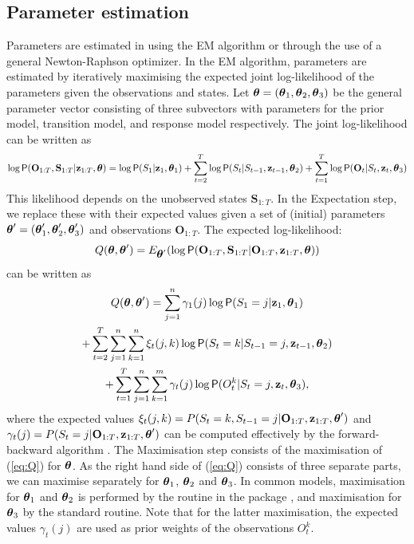 \documentclass[article]{jss}
\newcommand{\vc}{\mathbf}
\newcommand{\greekv}[1]{\mbox{\boldmath$\mathrm{#1}$}}
\begin{document}
\subsection{Parameter estimation}

Parameters are estimated in  using the EM algorithm or
through the use of a general Newton-Raphson optimizer.  In the EM
algorithm, parameters are estimated by iteratively maximising the
expected joint log-likelihood of the parameters given the observations and
states.  Let $\greekv{\theta} = (\greekv{\theta}_1,
\greekv{\theta}_2,\greekv{\theta}_3)$ be the general parameter vector
consisting of three subvectors with parameters for the prior model,
transition model, and response model respectively.  The joint
log-likelihood can be written as
\begin{equation}
\log \Prob(\vc{O}_{1:T}, \vc{S}_{1:T}|\vc{z}_{1:T},\greekv{\theta}) = \log 
\Prob(S_1|\vc{z}_{1},\greekv{\theta}_1) 
+ \sum_{t=2}^{T} \log \Prob(S_t|S_{t-1},\vc{z}_{t-1},\greekv{\theta}_2) 
+ \sum_{t=1}^{T} \log \Prob(\vc{O}_t|S_t,\vc{z}_t,\greekv{\theta}_3)
\end{equation}
This likelihood depends on the unobserved states $\vc{S}_{1:T}$. In the 
Expectation step, we replace these with their expected values given a set of 
(initial) parameters $\greekv{\theta}' = (\greekv{\theta}'_1, 
\greekv{\theta}'_2,\greekv{\theta}'_3)$ and observations $\vc{O}_{1:T}$. 
The expected log-likelihood:
\begin{equation}
Q(\greekv{\theta},\greekv{\theta}') = E_{\greekv{\theta}'} 
(\log \Prob(\vc{O}_{1:T},\vc{S}_{1:T}|\vc{O}_{1:T},\vc{z}_{1:T},\greekv{\theta}))
\end{equation}
can be written as
\begin{multline}
\label{eq:Q}
Q(\greekv{\theta},\greekv{\theta}') = 
\sum_{j=1}^n \gamma_1(j) \log \Prob(S_1=j|\vc{z}_1,\greekv{\theta}_1) \\ 
+ \sum_{t=2}^T \sum_{j=1}^n \sum_{k=1}^n \xi_t(j,k) \log \Prob(S_t = k|S_{t-1} 
= j,\vc{z}_{t-1},\greekv{\theta}_2)  \\
 + \sum_{t=1}^T \sum_{j=1}^n \sum_{k=1}^m \gamma_t(j) 
\log \Prob(O^k_t|S_t=j,\vc{z}_t,\greekv{\theta}_3),
\end{multline}
where the expected values $\xi_t(j,k) = P(S_t = k, S_{t-1} =
j|\vc{O}_{1:T}, \vc{z}_{1:T},\greekv{\theta}')$ and $\gamma_t(j) =
P(S_t = j|\vc{O}_{1:T}, \vc{z}_{1:T},\greekv{\theta}')$ can be
computed effectively by the forward-backward algorithm \citep[see
e.g.,][]{Rabiner1989}.  The Maximisation step consists of the
maximisation of (\ref{eq:Q}) for $\greekv{\theta}$.  As the right hand
side of (\ref{eq:Q}) consists of three separate parts, we can maximise
separately for $\greekv{\theta}_1$, $\greekv{\theta}_2$ and
$\greekv{\theta}_3$.  In common models, maximisation for
$\greekv{\theta}_1$ and $\greekv{\theta}_2$ is performed by the
 routine in the  package
\citep{Venables2002}, and maximisation for $\greekv{\theta}_3$ by the
standard  routine.  Note that for the latter maximisation,
the expected values $\gamma_t(j)$ are used as prior weights of the
observations $O^k_t$.
\end{document}
